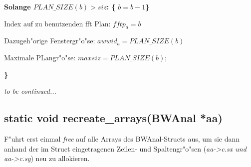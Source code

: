 \documentclass[12pt]{amsart}
\begin{document}
\textbf{Solange  $PLAN\_SIZE(b) > siz$: \{} $b=b-1$\textbf{\}}

Index auf zu benutzenden fft Plan: $fftp_a = b$

Dazugeh"orige Fenstergr"o"se: $awwid_a=PLAN\_SIZE(b)$

Maximale PLangr"o"se: $maxsiz= PLAN\_SIZE(b)$;

\textbf{\}}

\emph{to be continued...}


\subsection{static void recreate\_arrays(BWAnal *aa)} F"uhrt erst einmal \emph{free} auf alle Arrays des BWAnal-Structs aus, um sie dann anhand der im Struct eingetragenen Zeilen- und Spaltengr"o"sen (\emph{aa->c.sx und aa->c.sy}) neu zu allokieren.
\end{document}
